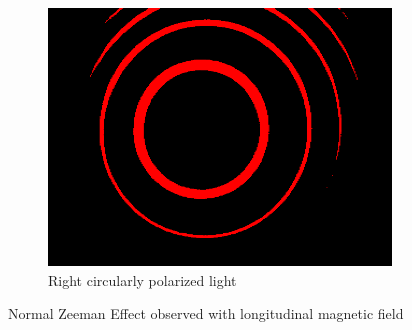 \begin{figure}
\begin{subfigure}[b]{0.45\textwidth}
        \includegraphics[width=\textwidth]{images/right_correct.png}
        \caption{Right circularly polarized light}
    \end{subfigure}
    \caption{Normal Zeeman Effect observed with longitudinal magnetic field}\label{f2}
\end{figure}

